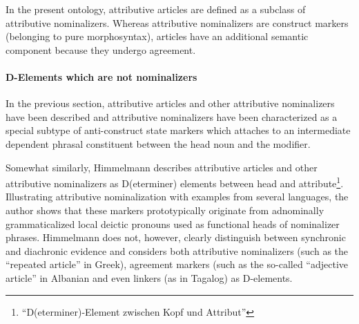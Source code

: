 In the present ontology, attributive articles are defined as a subclass of attributive nominalizers. Whereas attributive nominalizers are construct markers (belonging to pure morphosyntax), articles have an additional semantic component because they undergo agreement. %

\paragraph{D-Elements which are not nominalizers}
In the previous section, attributive articles and other attributive nominalizers have been described and attributive nominalizers have been characterized as a special subtype of anti-construct state markers which attaches to an intermediate dependent phrasal constituent between the head noun and the modifier.

Somewhat similarly, Himmelmann \citeyear{himmelmann1997} describes attributive articles and other attributive nominalizers as D(eterminer) elements between head and attribute\footnote{“D(eterminer)-Element zwischen Kopf und Attribut”}. Illustrating attributive nominalization with examples from several languages, the author shows that these markers prototypically originate from adnominally grammaticalized local deictic pronouns used as functional heads of nominalizer phrases. Himmelmann does not, however, clearly distinguish between synchronic and diachronic evidence and considers both attributive nominalizers (such as the “repeated article” in Greek), agreement markers (such as the so-called “adjective article” in Albanian and even linkers (as in Tagalog) as D-elements.

